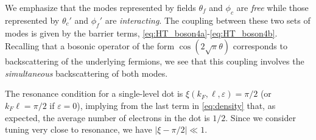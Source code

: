 \documentclass[aps,prb,reprint,floatfix,superscriptaddress,amssymb,amsmath]{revtex4-2}
\begin{document}
We emphasize that the modes represented by fields $\theta_f$ and $\phi_c$ are \textit{free} while those represented by $\theta_c'$ and $\phi_f'$ are \textit{interacting}. 
The coupling between these two sets of modes is given by the barrier terms, \eqref{eq:HT_boson4a}-\eqref{eq:HT_boson4b}.
Recalling that a bosonic operator of the form $\cos (2\sqrt{\pi}\theta)$ corresponds to backscattering of the underlying fermions, we see that this coupling involves the \emph{simultaneous} backscattering of both modes. 

The resonance condition for a single-level dot is $\xi(k_F,\ell,\varepsilon) \!=\! \pi/2$ (or $k_F\ell \!=\! \pi/2 $ if $\varepsilon\!=\!0$), implying from the last term in \eqref{eq:density} that, as expected, the average number of electrons in the dot is $1/2$. 
Since we consider tuning very close to resonance, we have $|\xi  \!-\! \pi/2| \ll 1$.  
\end{document}
